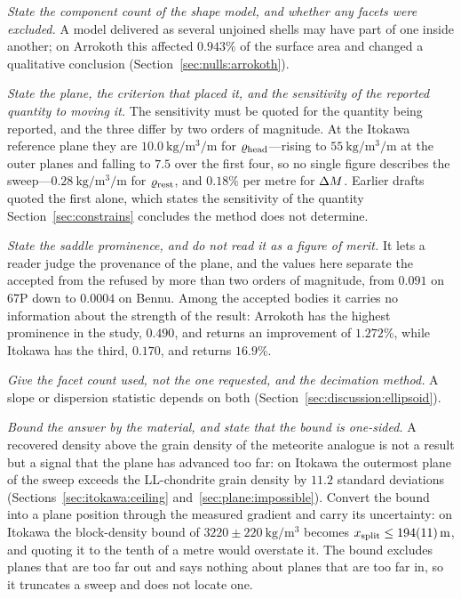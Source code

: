 \emph{State the component count of the shape model, and whether any facets
were excluded.} A model delivered as several unjoined shells may have part
of one inside another; on Arrokoth this affected $0.943\%$ of the surface
area and changed a qualitative conclusion
(Section~\ref{sec:nulls:arrokoth}).

\emph{State the plane, the criterion that placed it, and the sensitivity of
the reported quantity to moving it.} The sensitivity must be quoted for the
quantity being reported, and the three differ by two orders of magnitude. At
the Itokawa reference plane they are
$\SI{10.0}{\kilo\gram\per\cubic\metre\per\metre}$ for $\varrho_{\mathrm{head}}$---rising
to $\SI{55}{\kilo\gram\per\cubic\metre\per\metre}$ at the outer planes and
falling to $7.5$ over the first four, so no single figure describes the
sweep---$\SI{0.28}{\kilo\gram\per\cubic\metre\per\metre}$ for $\varrho_{\mathrm{rest}}$,
and $0.18\%$ per metre for $\Delta M$. Earlier drafts quoted the first alone,
which states the sensitivity of the quantity
Section~\ref{sec:constrains} concludes the method does not determine.

\emph{State the saddle prominence, and do not read it as a figure of merit.}
It lets a reader judge the provenance of the plane, and the values here
separate the accepted from the refused by more than two orders of magnitude,
from $0.091$ on 67P down to $0.0004$ on Bennu. Among the accepted bodies it
carries no information about the strength of the result: Arrokoth has the
highest prominence in the study, $0.490$, and returns an improvement of
$1.272\%$, while Itokawa has the third, $0.170$, and returns $16.9\%$.

\emph{Give the facet count used, not the one requested, and the decimation
method.} A slope or dispersion statistic depends on both
(Section~\ref{sec:discussion:ellipsoid}).

\emph{Bound the answer by the material, and state that the bound is
one-sided.} A recovered density above the grain density of the meteorite
analogue is not a result but a signal that the plane has advanced too far:
on Itokawa the outermost plane of the sweep exceeds the LL-chondrite grain
density by $11.2$ standard deviations
(Sections~\ref{sec:itokawa:ceiling} and~\ref{sec:plane:impossible}). Convert
the bound into a plane position through the measured gradient and carry its
uncertainty: on Itokawa the block-density bound of
$3220\pm\SI{220}{\kilo\gram\per\cubic\metre}$ becomes
$x_{\mathrm{split}} \le \SI{194+-11}{\metre}$, and quoting it to the tenth of a metre
would overstate it. The bound excludes planes that are too far out and says
nothing about planes that are too far in, so it truncates a sweep and does
not locate one.

